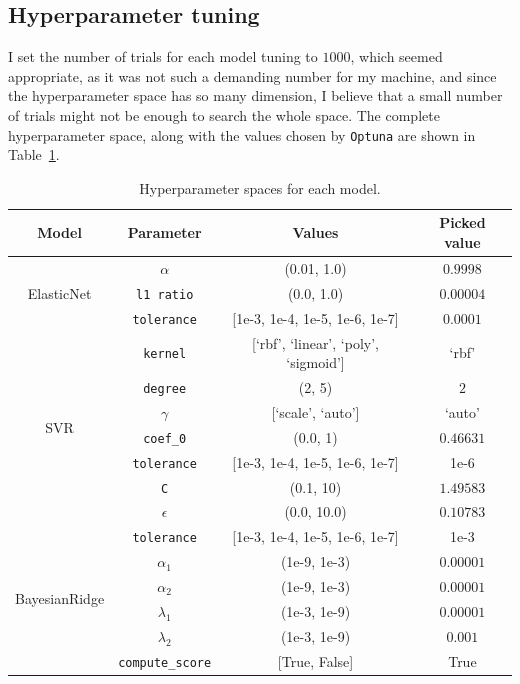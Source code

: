 \documentclass[12pt]{article}
\begin{document}
\subsection{Hyperparameter tuning}
I set the number of trials for each model tuning to $1000$, which seemed appropriate,
as it was not such a demanding number for my machine, and since the hyperparameter
space has so many dimension, I believe that a small number of trials might not be
enough to search the whole space. The complete hyperparameter space, along with the
values chosen by \texttt{Optuna} are shown in Table~\ref{tab:hyperparams}.

\begin{table}[H]
    \centering
    \begin{tabular}{|c|c|c|c|}
        \hline
        \textbf{Model} & \textbf{Parameter} & \textbf{Values} & \textbf{Picked value} \\
        \hline
        \multirow{3}{*}{ElasticNet} 
            & \texttt{$\alpha$} & (0.01, 1.0) & $0.9998$ \\
            & \texttt{l1 ratio} & (0.0, 1.0) & $0.00004$ \\
            & \texttt{tolerance} & [1e-3, 1e-4, 1e-5, 1e-6, 1e-7] & $0.0001$ \\
        \hline
        \multirow{7}{*}{SVR} 
            & \texttt{kernel} & [`rbf', `linear', `poly', `sigmoid'] & `rbf' \\
            & \texttt{degree} & (2, 5) & $2$ \\
            & \texttt{$\gamma$} & [`scale', `auto'] & `auto' \\
            & \texttt{coef\_0} & (0.0, 1) & $0.46631$ \\
            & \texttt{tolerance} & [1e-3, 1e-4, 1e-5, 1e-6, 1e-7] & 1e-6 \\
            & \texttt{C} & (0.1, 10) & $1.49583$ \\
            & \texttt{$\epsilon$} & (0.0, 10.0) & $0.10783$ \\
        \hline
        \multirow{6}{*}{BayesianRidge} 
            & \texttt{tolerance} & [1e-3, 1e-4, 1e-5, 1e-6, 1e-7] & 1e-3 \\
            & \texttt{$\alpha_1$} & (1e-9, 1e-3) & $0.00001$ \\
            & \texttt{$\alpha_2$} & (1e-9, 1e-3) & $0.00001$ \\
            & \texttt{$\lambda_1$} & (1e-3, 1e-9) & $0.00001$ \\
            & \texttt{$\lambda_2$} & (1e-3, 1e-9) & $0.001$ \\
            & \texttt{compute\_score} & [True, False] & True \\
        \hline
    \end{tabular}
    \caption{Hyperparameter spaces for each model.}
    \label{tab:hyperparams}
\end{table}
\end{document}
